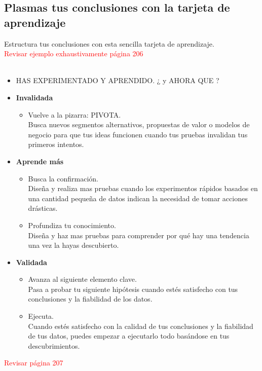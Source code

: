 \documentclass[11pt]{book}
\begin{document}
\subsection{Plasmas tus conclusiones con la tarjeta de aprendizaje}
Estructura tus conclusiones con esta sencilla tarjeta de aprendizaje.\\
\textcolor{red}{Revisar ejemplo exhaustivamente página 206}\\\\
\begin{itemize}
\item HAS EXPERIMENTADO Y APRENDIDO. ¿ y AHORA QUE ?
\end{itemize}
\begin{itemize}
\item \textbf{ Invalidada }\\
\begin{itemize}
\item Vuelve a la pizarra: PIVOTA.\\
Busca nuevos segmentos alternativos, propuestas de valor o modelos de negocio para que tus ideas funcionen cuando tus pruebas invalidan tus primeros intentos.
\end{itemize}
\item \textbf{ Aprende más }\\
\begin{itemize}
\item Busca la confirmación.\\
Diseña y realiza mas pruebas cuando los experimentos rápidos basados en una cantidad pequeña de datos indican la necesidad de tomar acciones drásticas.\\
\item Profundiza tu conocimiento.\\
Diseña y haz mas pruebas para comprender por qué hay una tendencia una vez la hayas descubierto.
\end{itemize}
\item \textbf{ Validada }\\
\begin{itemize}
\item Avanza al siguiente elemento clave.\\
Pasa a probar tu siguiente hipótesis cuando estés satisfecho con tus conclusiones y la fiabilidad de los datos.
\item Ejecuta.\\
Cuando estés satisfecho con la calidad de tus conclusiones y la fiabilidad de tus datos, puedes empezar a ejecutarlo todo basándose en tus descubrimientos.
\end{itemize}
\end{itemize}
\textcolor{red}{Revisar página 207}
\end{document}
